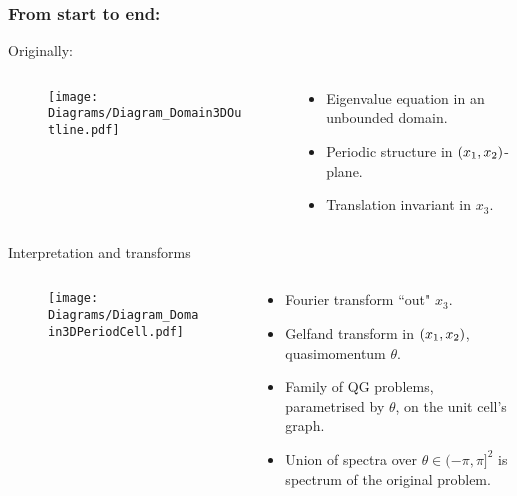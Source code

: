 \documentclass{beamer}
\begin{document}
\begin{frame}
	\frametitle{From start to end:}
	
	Originally:
	\begin{columns}
		\begin{column}{0.20\textwidth}
			\begin{figure}
				\centering
				\texttt{[image: Diagrams/Diagram\_Domain3DOutline.pdf]}
			\end{figure}			
		\end{column}
		\begin{column}{0.75\textwidth}
			\begin{itemize}
				\item Eigenvalue equation in an unbounded domain.
				\item Periodic structure in $\left( x_1,x_2 \right)$-plane.
				\item Translation invariant in $x_3$.
			\end{itemize}
		\end{column}
	\end{columns}
	
	\begin{block}{Interpretation and transforms}
		\begin{columns}
			\begin{column}{0.20\textwidth}
				\begin{figure}
					\centering
					\texttt{[image: Diagrams/Diagram\_Domain3DPeriodCell.pdf]}
				\end{figure}			
			\end{column}
			\begin{column}{0.75\textwidth}
				\begin{itemize}
					\item Fourier transform ``out" $x_3$.
					\item Gelfand transform in $\left( x_1,x_2 \right)$, quasimomentum $\theta$.
					\item Family of QG problems, parametrised by $\theta$, on the unit cell's graph.
					\item Union of spectra over $\theta\in(-\pi,\pi]^2$ is spectrum of the original problem.
				\end{itemize}
			\end{column}
		\end{columns}	
	\end{block}
\end{frame}
\end{document}
